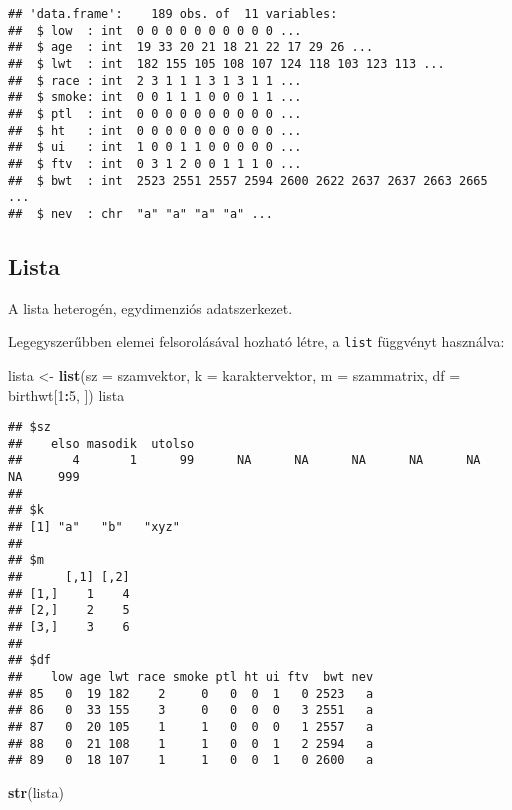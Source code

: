 \documentclass[
]{book}
\newenvironment{Shaded}{\begin{snugshade}}{\end{snugshade}}
\newcommand{\DataTypeTok}[1]{\textcolor[rgb]{0.13,0.29,0.53}{#1}}
\newcommand{\DecValTok}[1]{\textcolor[rgb]{0.00,0.00,0.81}{#1}}
\newcommand{\KeywordTok}[1]{\textcolor[rgb]{0.13,0.29,0.53}{\textbf{#1}}}
\newcommand{\NormalTok}[1]{#1}
\newcommand{\OperatorTok}[1]{\textcolor[rgb]{0.81,0.36,0.00}{\textbf{#1}}}
\newcommand{\StringTok}[1]{\textcolor[rgb]{0.31,0.60,0.02}{#1}}
\begin{document}
\begin{verbatim}
## 'data.frame':    189 obs. of  11 variables:
##  $ low  : int  0 0 0 0 0 0 0 0 0 0 ...
##  $ age  : int  19 33 20 21 18 21 22 17 29 26 ...
##  $ lwt  : int  182 155 105 108 107 124 118 103 123 113 ...
##  $ race : int  2 3 1 1 1 3 1 3 1 1 ...
##  $ smoke: int  0 0 1 1 1 0 0 0 1 1 ...
##  $ ptl  : int  0 0 0 0 0 0 0 0 0 0 ...
##  $ ht   : int  0 0 0 0 0 0 0 0 0 0 ...
##  $ ui   : int  1 0 0 1 1 0 0 0 0 0 ...
##  $ ftv  : int  0 3 1 2 0 0 1 1 1 0 ...
##  $ bwt  : int  2523 2551 2557 2594 2600 2622 2637 2637 2663 2665 ...
##  $ nev  : chr  "a" "a" "a" "a" ...
\end{verbatim}

\hypertarget{lista}{%
\subsection{Lista}\label{lista}}

A lista heterogén, egydimenziós adatszerkezet.

Legegyszerűbben elemei felsorolásával hozható létre, a \texttt{list} függvényt használva:

\begin{Shaded}
\begin{Highlighting}[]
\NormalTok{lista <-}\StringTok{ }\KeywordTok{list}\NormalTok{(}\DataTypeTok{sz =}\NormalTok{ szamvektor, }\DataTypeTok{k =}\NormalTok{ karaktervektor, }\DataTypeTok{m =}\NormalTok{ szammatrix, }\DataTypeTok{df =}\NormalTok{ birthwt[}\DecValTok{1}\OperatorTok{:}\DecValTok{5}\NormalTok{, }
\NormalTok{    ])}
\NormalTok{lista}
\end{Highlighting}
\end{Shaded}

\begin{verbatim}
## $sz
##    elso masodik  utolso                                                         
##       4       1      99      NA      NA      NA      NA      NA      NA     999 
## 
## $k
## [1] "a"   "b"   "xyz"
## 
## $m
##      [,1] [,2]
## [1,]    1    4
## [2,]    2    5
## [3,]    3    6
## 
## $df
##    low age lwt race smoke ptl ht ui ftv  bwt nev
## 85   0  19 182    2     0   0  0  1   0 2523   a
## 86   0  33 155    3     0   0  0  0   3 2551   a
## 87   0  20 105    1     1   0  0  0   1 2557   a
## 88   0  21 108    1     1   0  0  1   2 2594   a
## 89   0  18 107    1     1   0  0  1   0 2600   a
\end{verbatim}

\begin{Shaded}
\begin{Highlighting}[]
\KeywordTok{str}\NormalTok{(lista)}
\end{Highlighting}
\end{Shaded}
\end{document}
